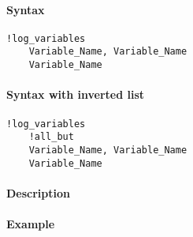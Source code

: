 


	\paragraph{Syntax}

\begin{verbatim}
!log_variables
    Variable_Name, Variable_Name
    Variable_Name
\end{verbatim}

\paragraph{Syntax with inverted list}

\begin{verbatim}
!log_variables
    !all_but
    Variable_Name, Variable_Name
    Variable_Name
\end{verbatim}

\paragraph{Description}

\paragraph{Example}



